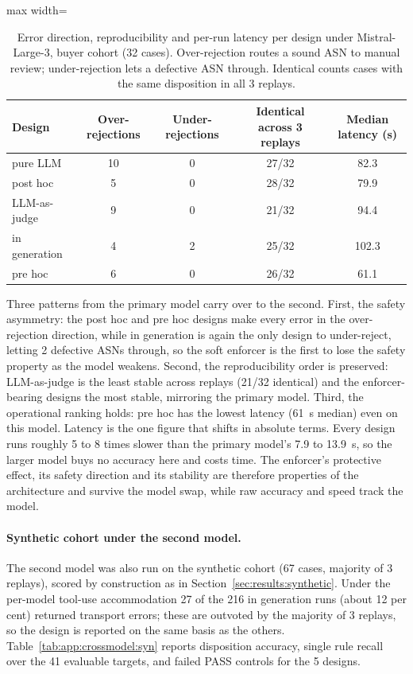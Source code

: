 \begin{table}[htbp]
\centering
\caption{Error direction, reproducibility and per-run latency per design under Mistral-Large-3, buyer cohort (32 cases). Over-rejection routes a sound ASN to manual review; under-rejection lets a defective ASN through. Identical counts cases with the same disposition in all 3 replays.}
\label{tab:app:crossmodel:errors}
\footnotesize
\begin{adjustbox}{max width=\textwidth}
\begin{tabular}{@{}lcccc@{}}
\toprule
\textbf{Design} & \textbf{Over-rejections} & \textbf{Under-rejections} & \textbf{Identical across 3 replays} & \textbf{Median latency (s)} \\
\midrule
pure LLM      & 10 & 0 & 27/32 & 82.3 \\
post hoc      & 5  & 0 & 28/32 & 79.9 \\
LLM-as-judge  & 9  & 0 & 21/32 & 94.4 \\
in generation & 4  & 2 & 25/32 & 102.3 \\
pre hoc       & 6  & 0 & 26/32 & 61.1 \\
\bottomrule
\end{tabular}
\end{adjustbox}
\end{table}

Three patterns from the primary model carry over to the second. First, the safety asymmetry: the post hoc and pre hoc designs make every error in the over-rejection direction, while in generation is again the only design to under-reject, letting 2 defective ASNs through, so the soft enforcer is the first to lose the safety property as the model weakens. Second, the reproducibility order is preserved: LLM-as-judge is the least stable across replays (21/32 identical) and the enforcer-bearing designs the most stable, mirroring the primary model. Third, the operational ranking holds: pre hoc has the lowest latency (61~s median) even on this model. Latency is the one figure that shifts in absolute terms. Every design runs roughly 5 to 8 times slower than the primary model's 7.9 to 13.9~s, so the larger model buys no accuracy here and costs time. The enforcer's protective effect, its safety direction and its stability are therefore properties of the architecture and survive the model swap, while raw accuracy and speed track the model.

\paragraph{Synthetic cohort under the second model.} The second model was also run on the synthetic cohort (67 cases, majority of 3 replays), scored by construction as in Section~\ref{sec:results:synthetic}. Under the per-model tool-use accommodation 27 of the 216 in generation runs (about 12 per cent) returned transport errors; these are outvoted by the majority of 3 replays, so the design is reported on the same basis as the others. Table~\ref{tab:app:crossmodel:syn} reports disposition accuracy, single rule recall over the 41 evaluable targets, and failed PASS controls for the 5 designs.

